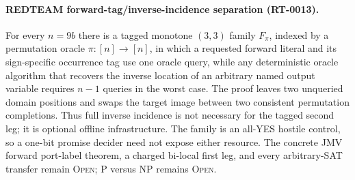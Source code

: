 \paragraph{REDTEAM forward-tag/inverse-incidence separation (RT-0013).}
For every $n=9b$ there is a tagged monotone $(3,3)$ family $F_\pi$, indexed
by a permutation oracle $\pi:[n]\to[n]$, in which a requested forward
literal and its sign-specific occurrence tag use one oracle query, while any
deterministic oracle algorithm that recovers the inverse location of an
arbitrary named output variable requires $n-1$ queries in the worst case.
The proof leaves two unqueried domain positions and swaps the target image
between two consistent permutation completions.  Thus full inverse incidence
is not necessary for the tagged second leg; it is optional offline
infrastructure.  The family is an all-YES hostile control, so a one-bit
promise decider need not expose either resource.  The concrete JMV forward
port-label theorem, a charged bi-local first leg, and every arbitrary-SAT
transfer remain \textsc{Open}; P versus NP remains \textsc{Open}.
